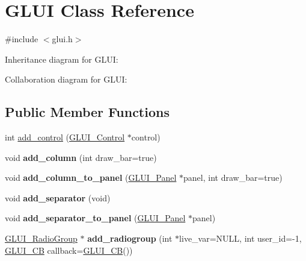 \hypertarget{class_g_l_u_i}{\section{G\+L\+U\+I Class Reference}
\label{class_g_l_u_i}
}


{\ttfamily \#include $<$glui.\+h$>$}



Inheritance diagram for G\+L\+U\+I\+:


Collaboration diagram for G\+L\+U\+I\+:
\subsection*{Public Member Functions}
\begin{DoxyCompactItemize}
\item 
int \hyperlink{class_g_l_u_i_a94398f830a14babcd93ac109082a221e}{add\+\_\+control} (\hyperlink{class_g_l_u_i___control}{G\+L\+U\+I\+\_\+\+Control} $\ast$control)
\item 
\hypertarget{class_g_l_u_i_a371273c28159a52e474d953101b462c8}{void {\bfseries add\+\_\+column} (int draw\+\_\+bar=true)}\label{class_g_l_u_i_a371273c28159a52e474d953101b462c8}

\item 
\hypertarget{class_g_l_u_i_a4c9f42cf5ac0a3a859533f44211ea023}{void {\bfseries add\+\_\+column\+\_\+to\+\_\+panel} (\hyperlink{class_g_l_u_i___panel}{G\+L\+U\+I\+\_\+\+Panel} $\ast$panel, int draw\+\_\+bar=true)}\label{class_g_l_u_i_a4c9f42cf5ac0a3a859533f44211ea023}

\item 
\hypertarget{class_g_l_u_i_a373d1d3fe27388c71d6d1b8767eb6590}{void {\bfseries add\+\_\+separator} (void)}\label{class_g_l_u_i_a373d1d3fe27388c71d6d1b8767eb6590}

\item 
\hypertarget{class_g_l_u_i_aba9244b448b4b38e7c45ef95f7b1763a}{void {\bfseries add\+\_\+separator\+\_\+to\+\_\+panel} (\hyperlink{class_g_l_u_i___panel}{G\+L\+U\+I\+\_\+\+Panel} $\ast$panel)}\label{class_g_l_u_i_aba9244b448b4b38e7c45ef95f7b1763a}

\item 
\hypertarget{class_g_l_u_i_abb6930a41fec25729fcc7a5cb1fd648c}{\hyperlink{class_g_l_u_i___radio_group}{G\+L\+U\+I\+\_\+\+Radio\+Group} $\ast$ {\bfseries add\+\_\+radiogroup} (int $\ast$live\+\_\+var=N\+U\+L\+L, int user\+\_\+id=-\/1, \hyperlink{class_g_l_u_i___c_b}{G\+L\+U\+I\+\_\+\+C\+B} callback=\hyperlink{class_g_l_u_i___c_b}{G\+L\+U\+I\+\_\+\+C\+B}())}\label{class_g_l_u_i_abb6930a41fec25729fcc7a5cb1fd648c}


\end{DoxyCompactItemize}
